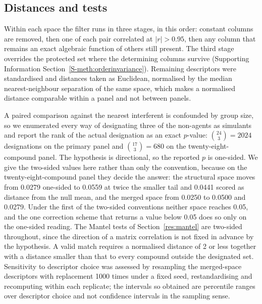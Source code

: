 \documentclass[journal=jacsat,manuscript=article,margin=1in]{achemso}
\begin{document}
\subsection{Distances and tests}
\label{meth:spaces}
Within each space the filter runs in three stages, in this order: constant
columns are removed, then one of each pair correlated at $|r| > 0.95$, then
any column that remains an exact algebraic function of others still present.
The third stage overrides the protected set where the determining columns
survive (Supporting Information
Section~\ref{S-meth:orderinvariance}). Remaining
descriptors were standardised and distances taken as Euclidean, normalised by
the median nearest-neighbour separation of the same space, which makes a
normalised distance comparable within a panel and not between panels.

A paired comparison against the nearest interferent is confounded by group
size, so we enumerated every way of designating three of the non-agents as
simulants and report the rank of the actual designation as an exact
$p$-value: $\binom{24}{3} = 2024$ designations on the primary panel and
$\binom{17}{3} = 680$ on the twenty-eight-compound panel. The hypothesis is
directional, so the reported $p$ is one-sided. We give the two-sided values
here rather than only the convention, because on the twenty-eight-compound
panel they decide the answer: the structural space moves from 0.0279
one-sided to 0.0559 at twice the smaller tail and 0.0441 scored as distance
from the null mean, and the merged space from 0.0250 to 0.0500 and 0.0279.
Under the first of the two-sided conventions neither space reaches 0.05, and
the one correction scheme that returns a value below 0.05 does so only on the
one-sided reading. The Mantel tests of Section~\ref{res:mantel} are
two-sided throughout, since the direction of a matrix correlation is not
fixed in advance by the hypothesis. A valid match requires a normalised distance of 2 or less
together with a distance smaller than that to every compound outside the
designated set. Sensitivity to descriptor choice was assessed by resampling
the merged-space descriptors with replacement 1000 times under a fixed seed,
restandardising and recomputing within each replicate; the intervals so
obtained are percentile ranges over descriptor choice and not confidence
intervals in the sampling sense.
\end{document}

